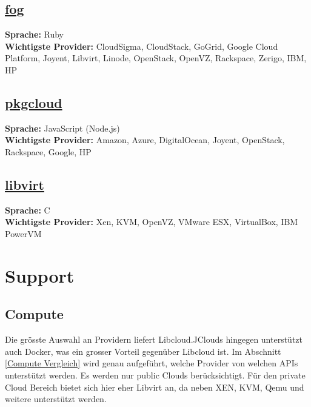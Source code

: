 \subsection{\href{https://github.com/fog/fog/blob/master/lib/fog/openstack/docs/getting_started.md}{fog}}
\textbf{Sprache: }Ruby\\
\textbf{Wichtigste Provider: }CloudSigma, CloudStack, GoGrid, Google Cloud Platform, Joyent, 
Libvirt, Linode, OpenStack, OpenVZ, Rackspace, Zerigo, IBM, HP\\

\subsection{\href{https://github.com/pkgcloud/pkgcloud}{pkgcloud}}
\textbf{Sprache: }JavaScript (Node.js)\\
\textbf{Wichtigste Provider: }Amazon, Azure, DigitalOcean, Joyent, OpenStack, Rackspace, Google, HP\\

\subsection{\href{http://http://libvirt.org/}{libvirt}}
\textbf{Sprache: }C\\
\textbf{Wichtigste Provider: }Xen, KVM, OpenVZ, VMware ESX, VirtualBox, IBM PowerVM\\

\newpage

\section{Support}
\subsection{Compute}
Die grösste Auswahl an Providern liefert Libcloud.JClouds hingegen 
unterstützt auch Docker, was ein grosser Vorteil gegenüber Libcloud ist. Im 
Abschnitt \ref{Compute Vergleich} wird genau aufgeführt, 
welche Provider von welchen APIs unterstützt werden. Es werden nur public Clouds berücksichtigt.
Für den private Cloud Bereich bietet sich hier eher Libvirt an, da neben XEN, 
KVM, Qemu und weitere unterstützt werden.

